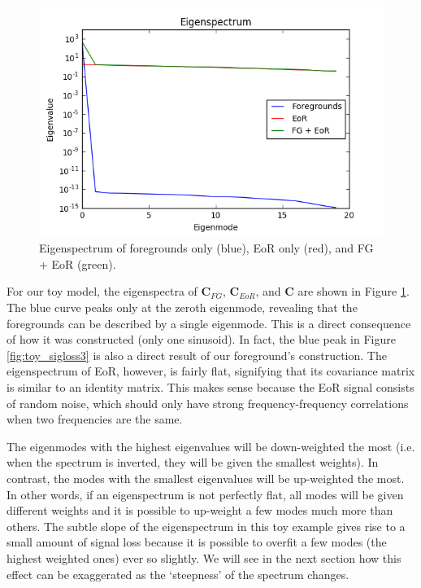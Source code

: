 \documentclass[preprint2,numberedappendix,tighten,twocolappendix]{aastex6}  %
\begin{document}
\begin{figure}
	\centering
	\includegraphics[trim={0.3cm 0.2cm 0.3cm 0.3cm},clip,width=\columnwidth]{plots/toy_sigloss2.png}
	\caption{Eigenspectrum of foregrounds only (blue), EoR only (red), and FG + EoR (green).}
	\label{fig:toy_sigloss2}
\end{figure}

For our toy model, the eigenspectra of $\textbf{C}_{FG}$, $\textbf{C}_{EoR}$, and $\textbf{C}$ are shown in Figure \ref{fig:toy_sigloss2}. The blue curve peaks only at the zeroth eigenmode, revealing that the foregrounds can be described by a single eigenmode. This is a direct consequence of how it was constructed (only one sinusoid). In fact, the blue peak in Figure \ref{fig:toy_sigloss3} is also a direct result of our foreground's construction. The eigenspectrum of EoR, however, is fairly flat, signifying that its covariance matrix is similar to an identity matrix. This makes sense because the EoR signal consists of random noise, which should only have strong frequency-frequency correlations when two frequencies are the same.

The eigenmodes with the highest eigenvalues will be down-weighted the most (i.e. when the spectrum is inverted, they will be given the smallest weights). In contrast, the modes with the smallest eigenvalues will be up-weighted the most. In other words, if an eigenspectrum is not perfectly flat, all modes will be given different weights and it is possible to up-weight a few modes much more than others. The subtle slope of the eigenspectrum in this toy example gives rise to a small amount of signal loss because it is possible to overfit a few modes (the highest weighted ones) ever so slightly. We will see in the next section how this effect can be exaggerated as the `steepness' of the spectrum changes.
\end{document}
